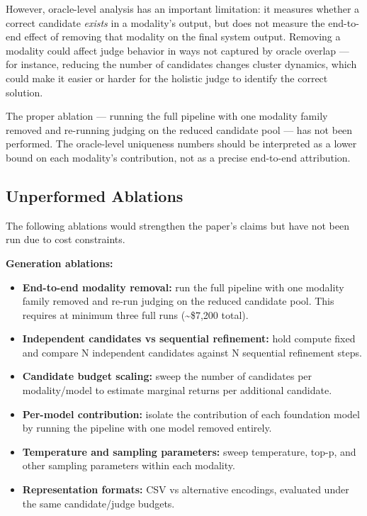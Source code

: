 \documentclass[10pt]{article}
\providecommand{\tightlist}{%
  \setlength{\itemsep}{0pt}\setlength{\parskip}{0pt}}
\begin{document}
However, oracle-level analysis has an important limitation: it measures
whether a correct candidate \emph{exists} in a modality's output, but
does not measure the end-to-end effect of removing that modality on the
final system output. Removing a modality could affect judge behavior in
ways not captured by oracle overlap --- for instance, reducing the
number of candidates changes cluster dynamics, which could make it
easier or harder for the holistic judge to identify the correct
solution.

The proper ablation --- running the full pipeline with one modality
family removed and re-running judging on the reduced candidate pool ---
has not been performed. The oracle-level uniqueness numbers should be
interpreted as a lower bound on each modality's contribution, not as a
precise end-to-end attribution.

\hypertarget{unperformed-ablations-1}{%
\subsection{Unperformed Ablations}\label{unperformed-ablations-1}}

The following ablations would strengthen the paper's claims but have not
been run due to cost constraints.

\textbf{Generation ablations:}

\begin{itemize}
\tightlist
\item
  \textbf{End-to-end modality removal:} run the full pipeline with one
  modality family removed and re-run judging on the reduced candidate
  pool. This requires at minimum three full runs (\textasciitilde\$7,200
  total).
\item
  \textbf{Independent candidates vs sequential refinement:} hold compute
  fixed and compare N independent candidates against N sequential
  refinement steps.
\item
  \textbf{Candidate budget scaling:} sweep the number of candidates per
  modality/model to estimate marginal returns per additional candidate.
\item
  \textbf{Per-model contribution:} isolate the contribution of each
  foundation model by running the pipeline with one model removed
  entirely.
\item
  \textbf{Temperature and sampling parameters:} sweep temperature,
  top-p, and other sampling parameters within each modality.
\item
  \textbf{Representation formats:} CSV vs alternative encodings,
  evaluated under the same candidate/judge budgets.
\end{itemize}
\end{document}
